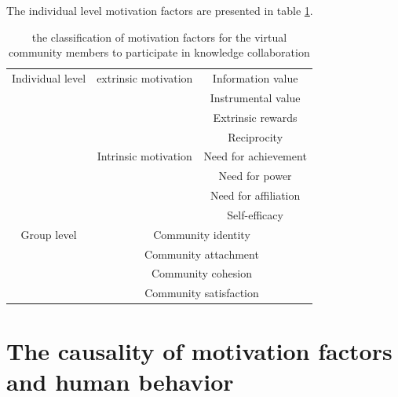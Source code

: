 \documentclass{elsarticle}
\begin{document}
The individual level motivation factors are presented in table \ref{tab:individual-level}.

\begin{table}[htpb]
  \label{tab:individual-level}
  \centering
   \caption{the classification of motivation factors for the virtual
    community members to participate in knowledge collaboration}
\begin{tabular}{ccc}
    \toprule
    \multicolumn{ 1}{c|}{Individual level} & \multicolumn{ 1}{|c|}{extrinsic motivation} & Information value \\
    \multicolumn{ 1}{c|}{} & \multicolumn{ 1}{|c|}{} & Instrumental value \\
    \multicolumn{ 1}{c|}{} & \multicolumn{ 1}{|c|}{} & Extrinsic rewards \\
    \multicolumn{ 1}{c|}{} & \multicolumn{ 1}{|c|}{} & Reciprocity \\\cline{2-3}
    \multicolumn{ 1}{c|}{} & \multicolumn{ 1}{|c|}{Intrinsic motivation} & Need for achievement \\
    \multicolumn{ 1}{c|}{} & \multicolumn{ 1}{|c|}{} & Need for power \\
    \multicolumn{ 1}{c|}{} & \multicolumn{ 1}{|c|}{} & Need for affiliation \\
    \multicolumn{ 1}{c|}{} & \multicolumn{ 1}{|c|}{} & Self-efficacy \\\hline
    \multicolumn{ 1}{c|}{Group level} & \multicolumn{ 2}{|c}{Community identity} \\
    \multicolumn{ 1}{c|}{} & \multicolumn{ 2}{|c}{Community attachment} \\
    \multicolumn{ 1}{c|}{} & \multicolumn{ 2}{|c}{Community cohesion} \\
    \multicolumn{ 1}{c|}{} & \multicolumn{ 2}{|c}{Community satisfaction} \\
    \bottomrule
    \end{tabular}
\end{table}

 

\section{The causality of motivation factors and human behavior}
\label{sec:modeling-process}
\end{document}
